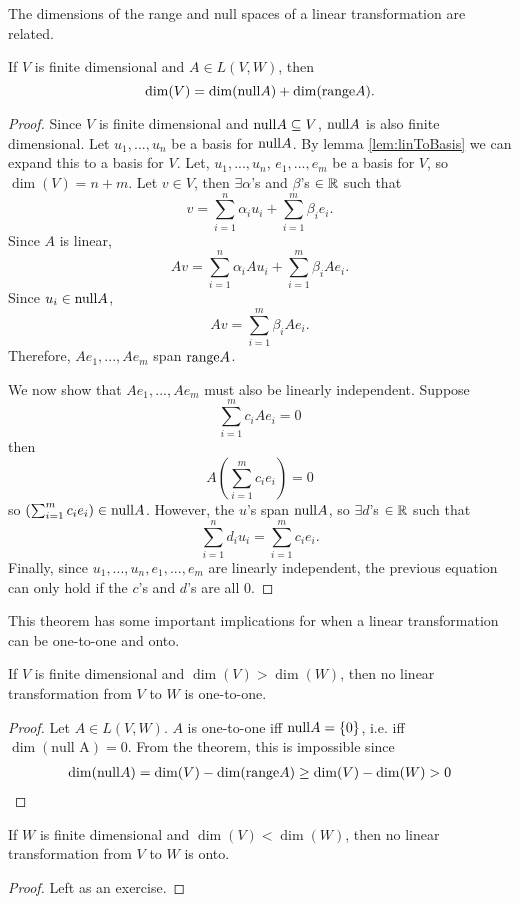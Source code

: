 The dimensions of the range and null spaces of
a linear transformation are related.
\begin{theorem}
  If $V$ is finite dimensional and $A \in L(V,W)$, then 
  \[ \mathrm{dim}(V) = \mathrm{dim}(\mathrm{null} A) + \mathrm{dim}(\mathrm{range} A). \]
\end{theorem}
\begin{proof}
  Since $V$ is finite dimensional and $\mathrm{null} A \subseteq V$,
  $\mathrm{null} A$ is also finite dimensional. Let $u_1, ..., u_n$ be
  a basis for $\mathrm{null} A$. By lemma \ref{lem:linToBasis} we can
  expand this to a basis for $V$. Let, $u_1, ...,
  u_n$, $e_1, ..., e_m$ be a basis for $V$, so $\dim(V) = n + m$. 
  Let $v \in V$, then $\exists \alpha$'s and $\beta$'s $\in \mathbb{R}$ such
  that 
  \[ v = \sum_{i=1}^n \alpha_i u_i  + \sum_{i=1}^m \beta_i e_i. \]
  Since $A$ is linear, 
  \[ A v = \sum_{i=1}^n \alpha_i A u_i  + \sum_{i=1}^m \beta_i A
  e_i. \]
  Since $u_i \in \mathrm{null} A$, 
  \[ A v =  \sum_{i=1}^m \beta_i A
  e_i. \]
  Therefore, $A e_1, ..., A e_m$ span $\mathrm{range} A$. 
  
  We now show that $A e_1, ..., A e_m$ must also be linearly
  independent. Suppose
  \[ \sum_{i=1}^m c_i A e_i = 0 \]
  then 
  \[ A \left( \sum_{i=1}^m c_i e_i \right) = 0\]
  so $\left( \sum_{i=1}^m c_i e_i \right) \in \mathrm{null}
  A$. However, the $u$'s span $ \mathrm{null} A$, so $\exists d$'s $\in
  \mathbb{R}$ such that
  \[ \sum_{i=1}^n d_i u_i = \sum_{i=1}^m c_i e_i. \]
  Finally, since $u_1, ..., u_n, e_1, ..., e_m$ are linearly
  independent, the previous equation can only hold if the $c$'s and
  $d$'s are all $0$. 
\end{proof}
This theorem has some important implications for when a linear
transformation can be one-to-one and onto. 
\begin{corollary}
  If $V$ is finite dimensional and $\dim(V) > \dim(W)$, then no linear
  transformation from $V$ to $W$ is one-to-one.
\end{corollary}
\begin{proof}
  Let $A \in L(V,W)$. $A$ is one-to-one iff $\mathrm{null} A = \{0\}$,
  i.e. iff $\dim(\text{null A}) = 0$. From the theorem, this is
  impossible since
  \begin{align*}
    \mathrm{dim}(\mathrm{null} A) = \mathrm{dim}(V) - \mathrm{dim}(\mathrm{range} A) \geq
    \mathrm{dim}(V) - \mathrm{dim}(W) > 0 
  \end{align*}
\end{proof}
\begin{corollary}
  If $W$ is finite dimensional and $\dim(V) < \dim(W)$, then no linear
  transformation from $V$ to $W$ is onto.
\end{corollary}
\begin{proof}
  Left as an exercise. 
\end{proof}


